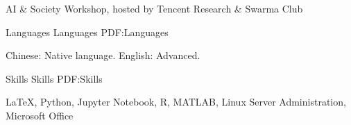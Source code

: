 \documentclass[letterpaper,MMMyyyy,nonstopmode]{CV}
\begin{document}
\begin{Body}
\Gap
\BulletItem
AI \& Society Workshop, hosted by Tencent Research \& Swarma Club
\hfill
{}



\Section
{Languages}
{Languages}
{PDF:Languages}

\BulletItem
Chinese: Native language.
\BulletItem
English: Advanced.


\Section
{Skills}
{Skills}
{PDF:Skills}

\Entry
{\LaTeX}, 
Python,
Jupyter Notebook,
R,
MATLAB,
Linux Server Administration,
Microsoft Office


%


%
%


\end{Body}
\end{document}
